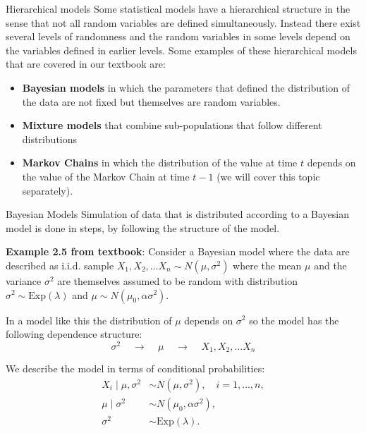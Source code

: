 \documentclass[8pt]{beamer}
\begin{document}
\begin{frame}{Hierarchical models}
Some statistical models have a hierarchical structure in the sense that not all random variables are defined simultaneously. Instead there exist several levels of randomness and the random variables in some levels depend on the variables defined in earlier levels. Some examples of these hierarchical models that are covered in our textbook are:

\vspace{2mm}

\begin{itemize}
	\item \textbf{Bayesian models} in which the parameters that defined the distribution of the data are not fixed but themselves are random variables.
	\item \textbf{Mixture models} that combine sub-populations that follow different distributions
	\item \textbf{Markov Chains} in which the distribution of the value at time $t$ depends on the value of the Markov Chain at time $t-1$ (we will cover this topic separately).
\end{itemize}
\end{frame}

\begin{frame}{Bayesian Models}
Simulation of data that is distributed according to a Bayesian model is done in steps, by following the structure of the model. 

\vspace{3mm}

\textbf{Example 2.5 from textbook}: Consider a Bayesian model where the data are described as i.i.d. sample $X_1, X_2, \ldots X_n \sim N(\mu, \sigma^2)$ where the mean $\mu$ and the variance $\sigma^2$ are themselves assumed to be random with distribution $\sigma^2 \sim \text{Exp}(\lambda)$ and $\mu \sim N(\mu_0, \alpha \sigma^2)$.

In a model like this the distribution of $\mu$ depends on $\sigma^2$ so the model has the following dependence structure:
\begin{equation*}
\sigma^2 \;\;\;\; \longrightarrow \;\;\;\; \mu \;\;\;\; \longrightarrow \;\;\;\; X_1, X_2, \ldots X_n
\end{equation*}

We describe the model in terms of conditional probabilities:
\begin{equation*}
\begin{aligned}
X_i \mid \mu, \sigma^2 &\sim N(\mu, \sigma^2), \quad i=1,\dots,n, \\
\mu \mid \sigma^2 &\sim N(\mu_0, \alpha\sigma^2), \\
\sigma^2 &\sim \text{Exp}(\lambda).
\end{aligned}
\end{equation*}
\end{frame}
\end{document}
